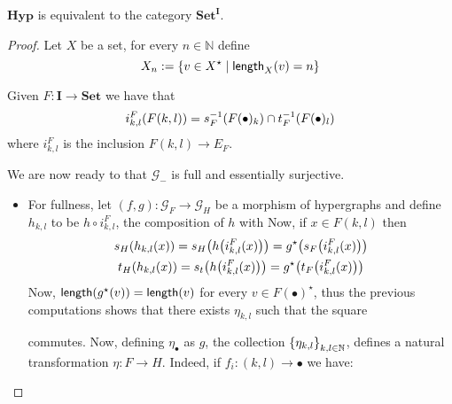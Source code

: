 \documentclass[runningheads,envcountsect]{lmcs}
\newcommand{\hyp}{\catname{Hyp}}
\newcommand{\catname}[1]{\mathbf{#1}}
\newcommand{\lgt}[0]{\mathsf{length}}
\theoremstyle{plain}
\theoremstyle{definition}
\begin{document}
\begin{prop}
	$\hyp$ is equivalent to the category $\catname{Set}^{\catname{I}}$.
\end{prop}
\begin{proof}
	Let $X$ be a set, for every $n\in \mathbb{N}$ define
	\[X_{n}:=\qty{v\in X^{\star} \mid \lgt_X(v)=n}\]

	Given $F:\catname{I}\to \catname{Set}$ we have that
	\[i^F_{k,l}\qty(F(k,l))=s^{-1}_F\qty(F(\bullet)_{k})\cap t^{-1}_F\qty(F(\bullet)_{l}) \]
	where $i^{F}_{k,l}$ is the inclusion $F(k,l)\to E_F$.
	
	We are now ready to that $\mathcal{G}_{-}$ is full and essentially surjective.
	\begin{itemize}
		\item For fullness, let $(f,g):\mathcal{G}_F\to \mathcal{G}_{H}$ be a morphism of hypergraphs and define $h_{k,l}$ to be $h\circ i^F_{k,l}$, the composition of $h$ with Now, if $x\in F(k,l)$ then 
		\begin{gather*}s_H\qty(h_{k,l}\qty(x))=s_H\qty(h\qty(i^F_{k,l}\qty(x)))=g^{\star}\qty(s_{F}\qty(i^F_{k,l}\qty(x)))\\t_H\qty(h_{k,l}\qty(x))=s_t\qty(h\qty(i^F_{k,l}\qty(x)))=g^{\star}\qty(t_{F}\qty(i^F_{k,l}\qty(x)))
		\end{gather*}
	Now, $\lgt\qty(g^{\star}(v))=\lgt\qty(v)$ for every $v\in F(\bullet)^{\star}$, thus the previous computations shows that there exists $\eta_{k,l}$ such that the square
	\begin{center}
	\end{center}
	commutes.  Now, defining $\eta_{\bullet}$ as $g$, the collection $\qty{\eta_{k,l}}_{k,l\in \mathbb{N}}$, defines a natural transformation $\eta:F\to H$. Indeed, if $f_i:(k,l)\to \bullet$ we have:
	\begin{center}
\end{center}
\end{itemize}
\end{proof}
\end{document}
